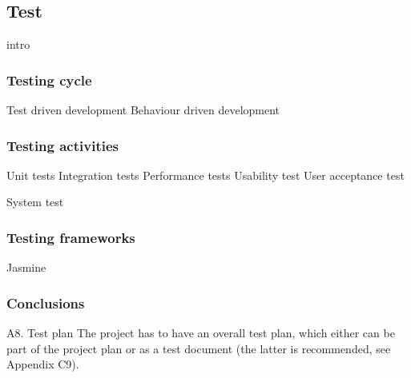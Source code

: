 \subsection{Test}

intro

\subsubsection{Testing cycle}

Test driven development
Behaviour driven development

\subsubsection{Testing activities}




Unit tests
	Integration tests
	Performance tests
	Usability test
	User acceptance test

	System test

\subsubsection{Testing frameworks}

Jasmine




\subsubsection{Conclusions}

A8. Test plan
The project has to have an overall test plan, which either can be part of the project plan or as a test 
document (the latter is recommended, see Appendix C9).